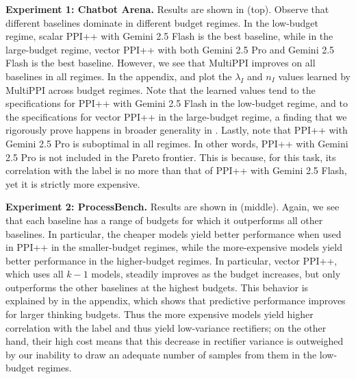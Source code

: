 \documentclass{article} %
\begin{document}
\textbf{Experiment 1: Chatbot Arena.}  Results are shown in  (top). Observe that different baselines dominate in different budget regimes. In the low-budget regime, scalar PPI++ with Gemini 2.5 Flash is the best baseline, while in the large-budget regime, vector PPI++ with both Gemini 2.5 Pro and Gemini 2.5 Flash is the best baseline.
However, we see that MultiPPI improves on all baselines in all regimes. In the appendix,  and  plot the $\lambda_I$ and $n_I$ values learned by MultiPPI across budget regimes. Note that the learned values tend to the specifications for PPI++ with Gemini 2.5 Flash in the low-budget regime, and to the specifications for vector PPI++ in the large-budget regime, a finding that we rigorously prove happens in broader generality in . Lastly, note that PPI++ with Gemini 2.5 Pro is suboptimal in all regimes. In other words, PPI++ with Gemini 2.5 Pro is not included in the Pareto frontier. This is because, for this task, its correlation with the label is no more than that of PPI++ with Gemini 2.5 Flash, yet it is strictly more expensive. %



%     

\textbf{Experiment 2: ProcessBench.} Results are shown in  (middle). Again, we see that each baseline has  a range of budgets for which it outperforms all other baselines. In particular, the cheaper models yield better performance when used in PPI++ in the smaller-budget regimes, while the more-expensive models yield better performance in the higher-budget regimes. In particular, vector PPI++, which uses all $k - 1$ models, steadily improves as the budget increases, but only outperforms the other baselines at the highest budgets. This behavior is explained by  in the appendix, which shows that predictive performance improves for larger thinking budgets. Thus the more expensive models yield higher correlation with the label and thus yield low-variance rectifiers; on the other hand, their high cost means that this decrease in rectifier variance is outweighed by our inability to draw an adequate number of samples from them in the low-budget regimes.
\end{document}
